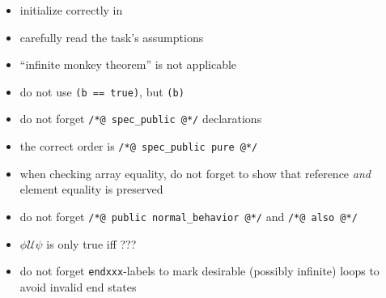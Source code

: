 \begin{itemize}
\item initialize correctly in 
\item carefully read the task's assumptions
\item ``infinite monkey theorem'' is not applicable
\item do not use \texttt{(b == true)}, but \texttt{(b)}
\item do not forget \texttt{/*@ spec\_public @*/} declarations
\item the correct order is \texttt{/*@ spec\_public pure @*/}
\item when checking array equality, do not forget to show that reference \emph{and} element equality is preserved
\item do not forget \texttt{/*@ public normal\_behavior @*/} and  \texttt{/*@ also @*/}
\item $\phi \mathcal U\psi$ is only true iff ???
\item do not forget \texttt{endxxx}-labels to mark desirable (possibly infinite) loops to avoid invalid end states
\end{itemize}